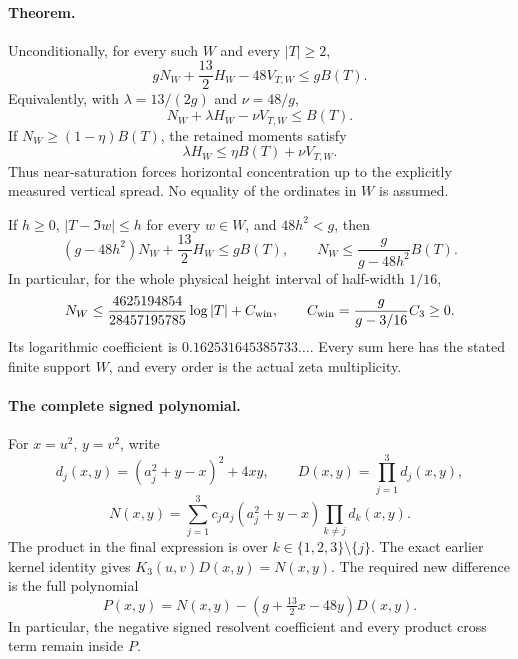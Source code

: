 \paragraph{Theorem.}
Unconditionally, for every such \(W\) and every \(|T|\ge2\),
\begin{equation}
 gN_W+\frac{13}{2}H_W-48V_{T,W}\le gB(T).
 \label{eq:cluster-budget}
\end{equation}
Equivalently, with \(\lambda=13/(2g)\) and \(\nu=48/g\),
\[
 N_W+\lambda H_W-\nu V_{T,W}\le B(T).
\]
If \(N_W\ge(1-\eta)B(T)\), the retained moments satisfy
\[
 \lambda H_W\le\eta B(T)+\nu V_{T,W}.
\]
Thus near-saturation forces horizontal concentration up to the explicitly
measured vertical spread.  No equality of the ordinates in \(W\) is assumed.

If \(h\ge0\), \(|T-\Im w|\le h\) for every \(w\in W\), and
\(48h^2<g\), then
\begin{equation}
 (g-48h^2)N_W+\frac{13}{2}H_W\le gB(T),\qquad
 N_W\le\frac{g}{g-48h^2}B(T).
 \label{eq:cluster-window}
\end{equation}
In particular, for the whole physical height interval of half-width
\(1/16\),
\begin{equation}
 N_W\le\frac{4625194854}{28457195785}\log|T|+C_{\rm win},\qquad
 C_{\rm win}=\frac{g}{g-3/16}C_3\ge0.
 \label{eq:cluster-sixteenth}
\end{equation}
Its logarithmic coefficient is \(0.162531645385733\ldots\).
Every sum here has the stated finite support \(W\), and every order is the
actual zeta multiplicity.

\paragraph{The complete signed polynomial.}
For \(x=u^2\), \(y=v^2\), write
\[
 d_j(x,y)=(a_j^2+y-x)^2+4xy,\qquad D(x,y)=\prod_{j=1}^3d_j(x,y),
\]
\[
 N(x,y)=\sum_{j=1}^3 c_ja_j(a_j^2+y-x)\prod_{k\ne j}d_k(x,y).
\]
The product in the final expression is over
\(k\in\{1,2,3\}\setminus\{j\}\).
The exact earlier kernel identity gives \(K_3(u,v)D(x,y)=N(x,y)\).
The required new difference is the full polynomial
\[
 P(x,y)=N(x,y)-(g+\tfrac{13}{2}x-48y)D(x,y).
\]
In particular, the negative signed resolvent coefficient and every product
cross term remain inside \(P\).

